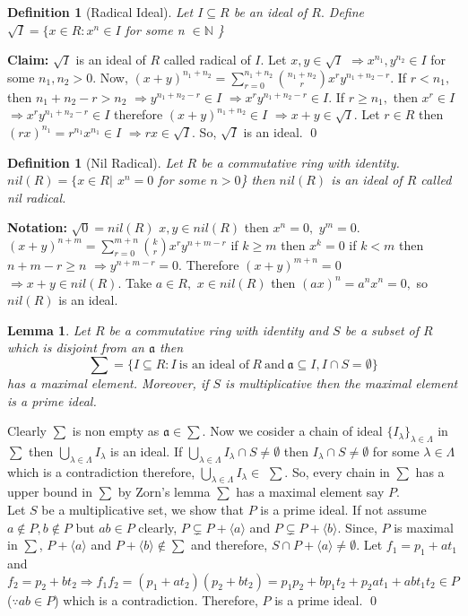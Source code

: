 \documentclass[11pt]{amsart}
\newtheorem{definition}[theorem]{Definition}%
\newtheorem{lemma}[theorem]{Lemma}%
\newcommand{\NN}{\mathbb N}
\newcommand{\gen}[1]{\langle#1\rangle}
\begin{document}
\begin{definition}[Radical Ideal] 
Let $I\subseteq R$ be an ideal of $R.$ Define $\sqrt{I}=\{x\in R:x^{n} \in I$ for some n $\in {\NN}$ \}
\end{definition}
\textbf{Claim:} $\sqrt{I}$ is an ideal of $R$ called radical of $I.$
\proof Let $x,y \in \sqrt{I}$ $\Rightarrow x^{n_{1}}, y^{n_{2}}\in I$ for some $n_{1},n_{2}>0.$ Now, $(x+y)^{n_{1}+n_{2}}={\displaystyle\sum_{r=0}^{n_{1}+n_{2}}}\binom{n_{1}+n_{2}}{r}x^{r}y^{n_{1}+n_{2}-r}.$ If $r<n_{1},$ then $n_{1}+n_{2}-r>n_{2}$ $\Rightarrow y^{n_{1}+n_{2}-r} \in I$ $\Rightarrow x^{r}y^{n_{1}+n_{2}-r} \in I.$ If $r\geq n_{1},$ then $x^{r}\in I$ $\Rightarrow  x^{r}y^{n_{1}+n_{2}-r} \in I$ therefore $(x+y)^{n_{1}+n_{2}} \in I$ $\Rightarrow x+y \in \sqrt{I}.$ 
Let $r \in R$ then $(rx)^{n_{1}}=r^{n_{1}}x^{n_{1}} \in I$ $\Rightarrow rx \in \sqrt{I}.$ So, $\sqrt{I}$ is an ideal.
\qed
\begin{definition}[Nil Radical] 
Let $R$ be a commutative ring with identity. $nil(R)=\{x \in R|$ $x^{n}=0$ for some $n>0$\} then $nil(R)$ is an ideal of $R$ called nil radical.
\end{definition}
\textbf{Notation:} $\sqrt{0}=nil(R)$
\newline $x,y \in nil(R)$ then $x^{n}=0,$ $y^{m}=0.$ $(x+y)^{n+m}={\displaystyle\sum_{r=0}^{m+n} \binom{k}{r} x^{r}y^{n+m-r}}$ if $k\geq m$ then $x^{k}=0$ if $k<m$ then $n+m-r\geq n$ $\Rightarrow y^{n+m-r}=0.$ Therefore $(x+y)^{m+n}=0$ $\Rightarrow x+y \in nil(R).$ Take $a\in R,$ $x \in nil(R)$ then $(ax)^{n}=a^{n}x^{n}=0,$ so $nil(R)$ is an ideal.
\begin{lemma}
Let $R$ be a commutative ring with identity and $S$ be a subset of $R$ which is disjoint from an $\mathfrak{a}$ then $$\sum=\{I\subseteq R: I~\text{is an ideal of}~R~\text{and}~\mathfrak{a}\subseteq I, I\cap S=\emptyset\}$$ has a maximal element. Moreover, if $S$ is multiplicative then the maximal element is a prime ideal.
\end{lemma}
\proof Clearly $\sum$ is non empty as $\mathfrak{a} \in \sum.$ Now we cosider a chain of ideal $\{I_{\lambda}\}_{\lambda\in \Lambda}$ in $\sum$ then $\displaystyle\bigcup_{\lambda\in \Lambda} I_\lambda$ is an ideal. If $\displaystyle\bigcup_{\lambda\in \Lambda} I_\lambda \cap S\neq \emptyset$ then $I_{\lambda}\cap S\neq \emptyset$ for some $\lambda\in \Lambda$ which is a contradiction therefore, $\displaystyle\bigcup_{\lambda\in \Lambda} I_\lambda\in$ $\sum.$ So, every chain in $\sum$ has a upper bound in $\sum$ by Zorn's lemma $\sum$ has a maximal element say $P$.\\ Let $S$ be a multiplicative set, we show that $P$ is a prime ideal. If not assume $a\notin P,b\notin P$ but $ab\in P$ clearly, $P\subsetneq P+\gen{a}$ and $P\subsetneq P+\gen{b}$. Since, $P$ is maximal in $\sum$, $P+\gen{a}$ and $P+\gen{b}\notin \sum$ and therefore, $S\cap P+\gen{a}\neq \emptyset.$ Let $f_1=p_1+at_1$ and $f_2=p_2+bt_2 \Rightarrow f_1f_2=(p_1+at_2)(p_2+bt_2)=p_1p_2+bp_1t_2+p_2at_1+abt_1t_2\in P$ ($\because ab\in P$) which is a contradiction. Therefore, $P$ is a prime ideal. \qed 
\end{document}
